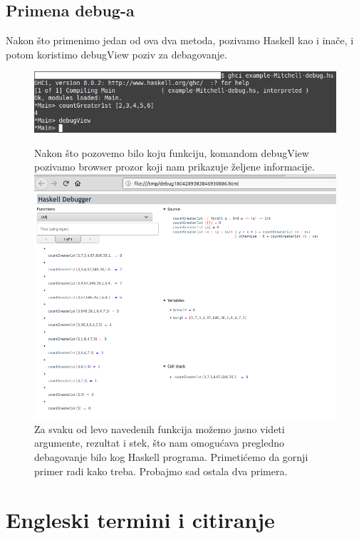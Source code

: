 \documentclass[a4paper]{article}
\begin{document}
\subsection{Primena debug-a}
Nakon što primenimo jedan od ova dva metoda, pozivamo Haskell kao i inače, i potom koristimo debugView poziv za debagovanje.
\begin{figure}[h!]
\begin{center}
\includegraphics[scale=0.5]{pozivanje-mitchell.png}
\end{center}
Nakon što pozovemo bilo koju funkciju, komandom debugView pozivamo browser prozor koji nam prikazuje željene informacije.
\includegraphics[scale=0.4]{mitchell-browser-pregled.png}
Za svaku od levo navedenih funkcija možemo jasno videti argumente, rezultat i stek, što nam omogućava pregledno debagovanje bilo kog Haskell programa.
Primetićemo da gornji primer radi kako treba. Probajmo sad ostala dva primera.
\end{figure}

\section{Engleski termini i citiranje}	
\label{sec:termini_i_citiranje}
\end{document}
